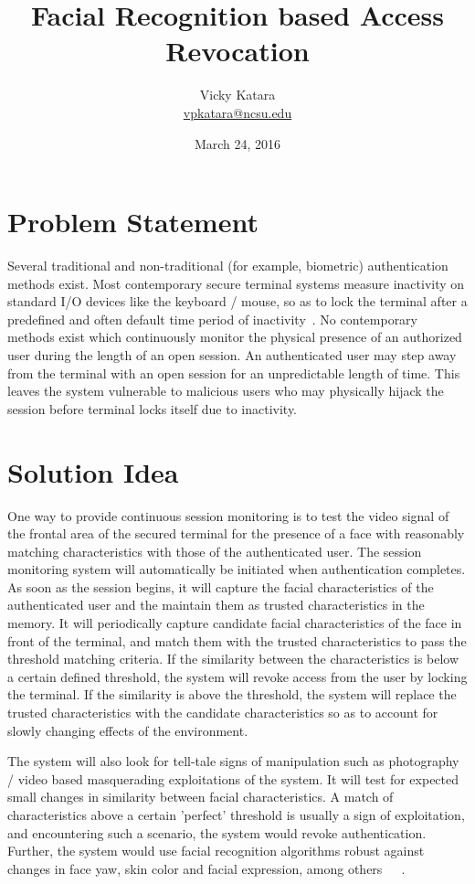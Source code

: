 \documentclass[10pt,twocolumn,pdftex]{article}
\title{Facial Recognition based Access Revocation}
\author{Vicky Katara \\
\url{vpkatara@ncsu.edu}}
\date{March 24, 2016}
\begin{document}
\maketitle

\section{Problem Statement}

Several traditional and non-traditional (for example, biometric) authentication methods exist. Most contemporary secure terminal systems measure inactivity on standard I/O devices like the keyboard / mouse, so as to lock the terminal after a predefined and often default time period of inactivity~\cite{xue05}. No contemporary methods exist which continuously monitor the physical presence of an authorized user during the length of an open session. An authenticated user may step away from the terminal with an open session for an unpredictable length of time. This leaves the system vulnerable to malicious users who may physically hijack the session before terminal locks itself due to inactivity.

\section{Solution Idea}

One way to provide continuous session monitoring is to test the video signal of the frontal area of the secured terminal for the presence of a face with reasonably matching characteristics with those of the authenticated user. The session monitoring system will automatically be initiated when authentication completes. As soon as the session begins, it will capture the facial characteristics of the authenticated user and the maintain them as trusted characteristics in the memory. It will periodically capture candidate facial characteristics of the face in front of the terminal, and match them with the trusted characteristics to pass the threshold matching criteria. If the similarity between the characteristics is below a certain defined threshold, the system will revoke access from the user by locking the terminal. If the similarity is above the threshold, the system will replace the trusted characteristics with the candidate characteristics so as to account for slowly changing effects of the environment. 

The system will also look for tell-tale signs of manipulation such as photography / video based masquerading exploitations of the system. It will test for expected small changes in similarity between facial characteristics. A match of characteristics above a certain 'perfect' threshold is usually a sign of exploitation, and encountering such a scenario, the system would revoke authentication. Further, the system would use facial recognition algorithms robust against changes in face yaw, skin color and facial expression, among others~\cite{frvt02}~\cite{amr05}~\cite{kovac03}.
\end{document}
